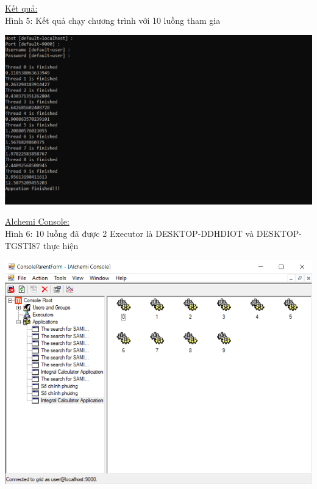 \documentclass[12pt,a4paper]{article}
\begin{document}
\underline{Kết quả:}\\[0.5cm]

Hình 5: Kết quả chạy chương trình với 10 luồng tham gia
\begin{center}
\includegraphics[scale=0.7]{3.png} \\[5.5cm]
\end{center}



\underline{Alchemi Console:}\\[0.5cm]

Hình 6: 10 luồng đã được 2 Executor là DESKTOP-DDHDIOT và DESKTOP-TGSTI87 thực hiện
\begin{center}
\includegraphics[scale=0.86]{3.0.png}
\end{center}
\end{document}
